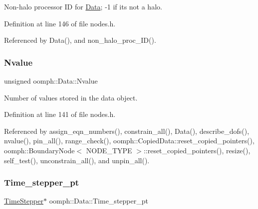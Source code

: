 Non-\/halo processor ID for \hyperlink{classoomph_1_1Data}{Data}; -\/1 if it\textquotesingle{}s not a halo. 



Definition at line 146 of file nodes.\+h.



Referenced by Data(), and non\+\_\+halo\+\_\+proc\+\_\+\+I\+D().

\mbox{\label{classoomph_1_1Data_a379d45fb0d0170fcdec06dbbc97a504d}} 
\subsubsection{\texorpdfstring{Nvalue}{Nvalue}}
{\footnotesize\ttfamily unsigned oomph\+::\+Data\+::\+Nvalue\hspace{0.3cm}{\ttfamily [private]}}



Number of values stored in the data object. 



Definition at line 141 of file nodes.\+h.



Referenced by assign\+\_\+eqn\+\_\+numbers(), constrain\+\_\+all(), Data(), describe\+\_\+dofs(), nvalue(), pin\+\_\+all(), range\+\_\+check(), oomph\+::\+Copied\+Data\+::reset\+\_\+copied\+\_\+pointers(), oomph\+::\+Boundary\+Node$<$ N\+O\+D\+E\+\_\+\+T\+Y\+P\+E $>$\+::reset\+\_\+copied\+\_\+pointers(), resize(), self\+\_\+test(), unconstrain\+\_\+all(), and unpin\+\_\+all().

\mbox{\label{classoomph_1_1Data_a63442f4cabaff13e7116e0b80d350d92}} 
\subsubsection{\texorpdfstring{Time\+\_\+stepper\+\_\+pt}{Time\_stepper\_pt}}
{\footnotesize\ttfamily \hyperlink{classoomph_1_1TimeStepper}{Time\+Stepper}$\ast$ oomph\+::\+Data\+::\+Time\+\_\+stepper\+\_\+pt\hspace{0.3cm}{\ttfamily [private]}}



